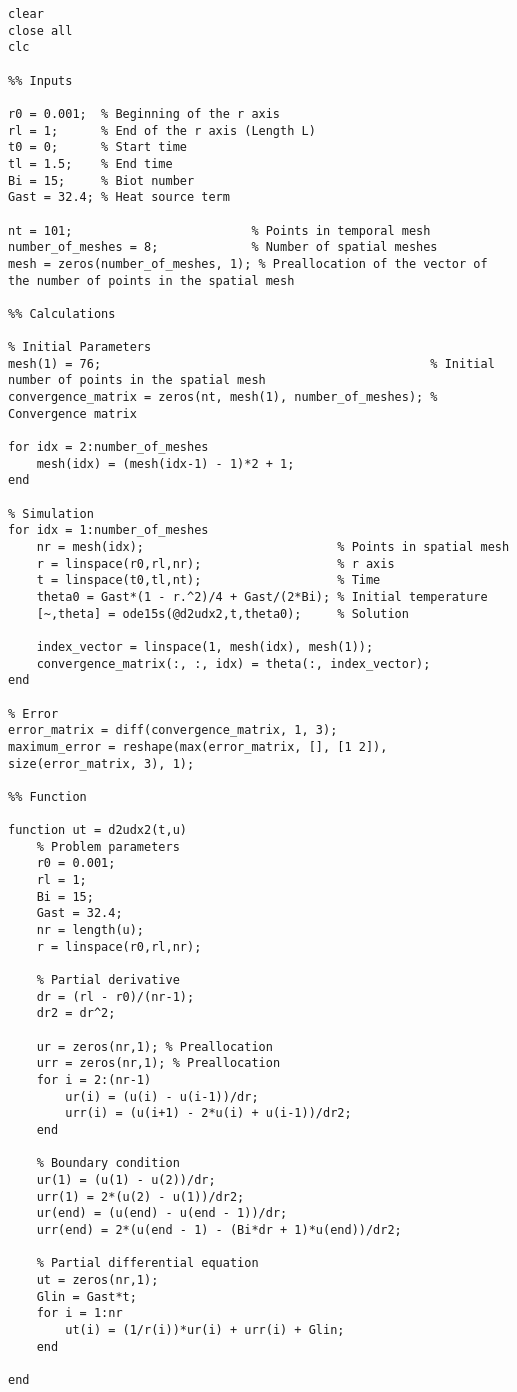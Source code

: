 \begin{lstlisting}
clear
close all
clc

%% Inputs

r0 = 0.001;  % Beginning of the r axis
rl = 1;      % End of the r axis (Length L)
t0 = 0;      % Start time
tl = 1.5;    % End time
Bi = 15;     % Biot number
Gast = 32.4; % Heat source term

nt = 101;                         % Points in temporal mesh
number_of_meshes = 8;             % Number of spatial meshes
mesh = zeros(number_of_meshes, 1); % Preallocation of the vector of the number of points in the spatial mesh

%% Calculations

% Initial Parameters
mesh(1) = 76;                                              % Initial number of points in the spatial mesh
convergence_matrix = zeros(nt, mesh(1), number_of_meshes); % Convergence matrix

for idx = 2:number_of_meshes
    mesh(idx) = (mesh(idx-1) - 1)*2 + 1;
end

% Simulation
for idx = 1:number_of_meshes
    nr = mesh(idx);                           % Points in spatial mesh
    r = linspace(r0,rl,nr);                   % r axis
    t = linspace(t0,tl,nt);                   % Time
    theta0 = Gast*(1 - r.^2)/4 + Gast/(2*Bi); % Initial temperature
    [~,theta] = ode15s(@d2udx2,t,theta0);     % Solution

    index_vector = linspace(1, mesh(idx), mesh(1));
    convergence_matrix(:, :, idx) = theta(:, index_vector);
end

% Error
error_matrix = diff(convergence_matrix, 1, 3);
maximum_error = reshape(max(error_matrix, [], [1 2]), size(error_matrix, 3), 1);

%% Function

function ut = d2udx2(t,u)
	% Problem parameters
	r0 = 0.001;
    rl = 1;
    Bi = 15;
    Gast = 32.4;
    nr = length(u);
    r = linspace(r0,rl,nr);
    
	% Partial derivative
	dr = (rl - r0)/(nr-1);
    dr2 = dr^2;
    
    ur = zeros(nr,1); % Preallocation
	urr = zeros(nr,1); % Preallocation
	for i = 2:(nr-1)
        ur(i) = (u(i) - u(i-1))/dr;
        urr(i) = (u(i+1) - 2*u(i) + u(i-1))/dr2;
	end

	% Boundary condition
    ur(1) = (u(1) - u(2))/dr;
	urr(1) = 2*(u(2) - u(1))/dr2;
    ur(end) = (u(end) - u(end - 1))/dr;
	urr(end) = 2*(u(end - 1) - (Bi*dr + 1)*u(end))/dr2;

    % Partial differential equation
    ut = zeros(nr,1);
    Glin = Gast*t;
    for i = 1:nr
        ut(i) = (1/r(i))*ur(i) + urr(i) + Glin;
    end
  
end
\end{lstlisting}


